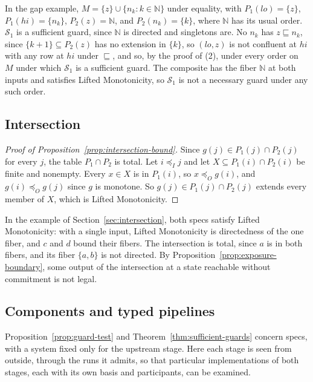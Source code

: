 \documentclass[sigconf]{cidr-2027}
\theoremstyle{remark}
\newcommand{\InputOrd}{\preceq_I}
\newcommand{\OutputOrd}{\preceq_O}
\newcommand{\commitment}{commitment\xspace}
\newcommand{\outrel}{extends\xspace}          %
\newcommand{\Spec}{\mathcal{S}}
\begin{document}
In the gap example, $M=\{z\}\cup\{n_k:k\in\mathbb N\}$ under equality, with
$P_1(\mathit{lo})=\{z\}$, $P_1(\mathit{hi})=\{n_k\}$, $P_2(z)=\mathbb N$, and
$P_2(n_k)=\{k\}$, where $\mathbb N$ has its usual order. $\Spec_1$ is a
sufficient guard, since $\mathbb N$ is directed and singletons are. No $n_k$ has
$z\sqsubseteq n_k$, since $\{k+1\}\subseteq P_2(z)$ has no extension in
$\{k\}$, so $(\mathit{lo},z)$ is not confluent at $\mathit{hi}$ with any row at $\mathit{hi}$
under $\sqsubseteq$, and so, by the proof of (2), under every order on $M$ under
which $\Spec_1$ is a sufficient guard. The composite has the fiber $\mathbb N$
at both inputs and satisfies Lifted Monotonicity, so $\Spec_1$ is not a
necessary guard under any such order.

\subsection{Intersection}
\label{app:intersection}

\begin{proof}[Proof of Proposition~\ref{prop:intersection-bound}]
Since $g(j)\in P_1(j)\cap P_2(j)$ for every $j$, the table $P_1\cap P_2$ is
total. Let $i\InputOrd j$ and let $X\subseteq P_1(i)\cap P_2(i)$ be finite and
nonempty. Every $x\in X$ is in $P_1(i)$, so $x\OutputOrd g(i)$, and
$g(i)\OutputOrd g(j)$ since $g$ is monotone. So $g(j)\in P_1(j)\cap P_2(j)$
\outrel every member of $X$, which is Lifted Monotonicity.
\end{proof}

In the example of Section~\ref{sec:intersection}, both specs satisfy Lifted
Monotonicity: with a single input, Lifted Monotonicity is directedness of the
one fiber, and $c$ and $d$ bound their fibers. The intersection is total, since
$a$ is in both fibers, and its fiber $\{a,b\}$ is not directed. By
Proposition~\ref{prop:exposure-boundary}, some output of the intersection at a
state reachable without \commitment is not legal.

\subsection{Components and typed pipelines}
\label{app:components}

Proposition~\ref{prop:guard-test} and Theorem~\ref{thm:sufficient-guards} concern specs, with a system fixed only
for the upstream stage. Here each stage is seen from outside, through the
runs it admits, so that particular implementations of both stages, each with
its own basis and participants, can be examined.
\end{document}
